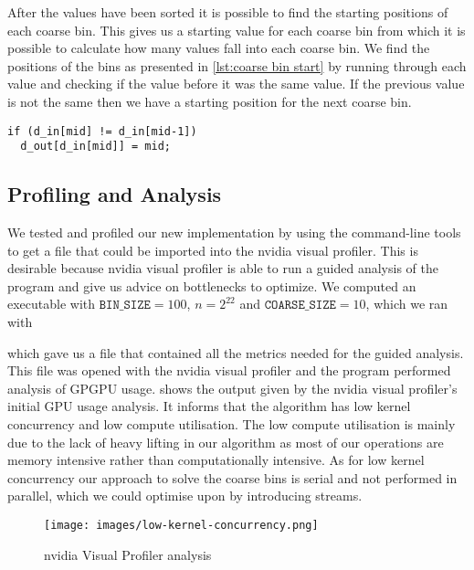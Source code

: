 After the values have been sorted it is possible to find the starting positions of each coarse bin.
This gives us a starting value for each coarse bin from which it is possible to calculate how many values fall into each coarse bin.
We find the positions of the bins as presented in \cref{lst:coarse bin start} by running through each value and checking if the value before it was the same value.
If the previous value is not the same then we have a starting position for the next coarse bin.

\begin{lstlisting}[caption={find the start positions of each coarse bin}, label={lst:coarse bin start}, numbers=none]
if (d_in[mid] != d_in[mid-1])
  d_out[d_in[mid]] = mid;
\end{lstlisting}

\subsection{Profiling and Analysis}

We tested and profiled our new implementation by using the  command-line tools to get a file that could be imported into the nvidia visual profiler.
This is desirable because nvidia visual profiler is able to run a guided analysis of the program and give us advice on bottlenecks to optimize.
We computed an executable with $\mathtt{BIN\_SIZE}=100$, $n=2^{22}$ and $\mathtt{COARSE\_SIZE}=10$, which we ran with

\begin{quote}
\end{quote}

which gave us a file that contained all the metrics needed for the guided analysis.
This file was opened with the nvidia visual profiler and the program performed analysis of GPGPU usage.
 shows the output given by the nvidia visual profiler's initial GPU usage analysis.
It informs that the algorithm has low kernel concurrency and low compute utilisation.
The low compute utilisation is mainly due to the lack of heavy lifting in our algorithm as most of our operations are memory intensive rather than computationally intensive.
As for low kernel concurrency our approach to solve the coarse bins is serial and not performed in parallel, which we could optimise upon by introducing streams.
\begin{figure}[htb]
  \centering
  \texttt{[image: images/low-kernel-concurrency.png]}
  \caption{nvidia Visual Profiler analysis}
  \label{fig:first impl}
\end{figure}

